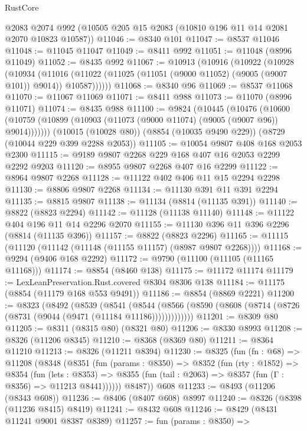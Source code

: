 \begin{lexlean}{RustCore}
\begin{coremodule}
    @2083
    @2074
    @992
    (@10505 @205 @15 @2083 (@10810 @196 @11 @14 @2081 @2070 @10823 @10587))
@11046 := @8340 @101
@11047 := @8537 @11046
@11048 := @11045 @11047
@11049 := @8411 @992
@11051 := @11048 (@8996 @11049)
@11052 := @8435 @992
@11067 := @10913
    (@10916
      (@10922
        (@10928
          (@10934
            (@11016 (@11022 (@11025 (@11051 (@9000 @11052) (@9005 (@9007 @101)) @9014)) @10587))))))
@11068 := @8340 @96
@11069 := @8537 @11068
@11070 := @11067 @11069
@11071 := @8411 @988
@11073 := @11070 (@8996 @11071)
@11074 := @8435 @988
@11100 := @9824
    (@10445
      (@10476
        (@10600 (@10759 (@10899 (@10903 (@11073 (@9000 @11074) (@9005 (@9007 @96)) @9014)))))))
    (@10015 (@10028 @80))
    (@8854 (@10035 @9490 @229))
    (@8729 (@10044 @229 @399 @2288 @2053))
@11105 := @10054 @9807 @408 @168 @2053 @2300
@11115 := @9189 @9807 @2268 @229 @168 @407 @16 @2053 @2299 @2292 @9203
@11120 := @8955 @9807 @2268 @407 @16 @2299
@11122 := @8964 @9807 @2268
@11128 := @11122 @402 @406 @11 @15 @2294 @2298
@11130 := @8806 @9807 @2268
@11134 := @11130 @391 @11 @391 @2294
@11135 := @8815 @9807
@11138 := @11134 (@8814 (@11135 @391))
@11140 := @8822 (@8823 @2294)
@11142 := @11128 (@11138 @11140)
@11148 := @11122 @404 @196 @11 @14 @2296 @2070
@11155 := @11130 @396 @11 @396 @2296 (@8814 (@11135 @396))
@11157 := @8822 (@8823 @2296)
@11165 := @11115 (@11120 (@11142 (@11148 (@11155 @11157) (@8987 @9807 @2268))))
@11168 := @9294 (@9406 @168 @2292)
@11172 := @9790 (@11100 (@11105 (@11165 @11168)))
@11174 := @8854 (@8460 @138)
@11175 := @11172 @11174
@11179 := LexLeanPreservation.Rust.covered @8304 @8306 @138
@11184 := @11175 (@8854 (@11179 @168 @553 @9491))
@11186 := @8854 (@8869 @2221)
@11200 := @8323
    (@8492
      (@8539
        (@8541
          (@8544 (@8566 (@8590 (@8608 (@8714 (@8726 (@8731 (@9044 (@9471 (@11184 @11186)))))))))))))
@11201 := @8309 @80
@11205 := @8311 (@8315 @80) (@8321 @80)
@11206 := @8330 @8993
@11208 := @8326 (@11206 @8345)
@11210 := @8368 (@8369 @80)
@11211 := @8364 @11210
@11213 := @8326 (@11211 @8394)
@11230 := @8325
    (fun (fn : @68) =>
    @11208
      (@8348
        (@8351
          (fun (params : @8350) =>
          @8352
            (fun (rty : @1852) =>
            @8354
              (fun (lets : @8353) =>
              @8355 (fun (tail : @2063) => @8357 (fun (Γ : @8356) => @11213 @8441))))))
        @8487))
    @608
@11233 := @8493 (@11206 (@8343 @608))
@11236 := @8406 (@8407 @608) @8997
@11240 := @8326 (@8398 (@11236 @8415) @8419)
@11241 := @8432 @608
@11246 := @8429 (@8431 @11241 @9001 @8387 @8389)
@11257 := fun (params : @8350) =>

\end{coremodule}
\end{lexlean}
